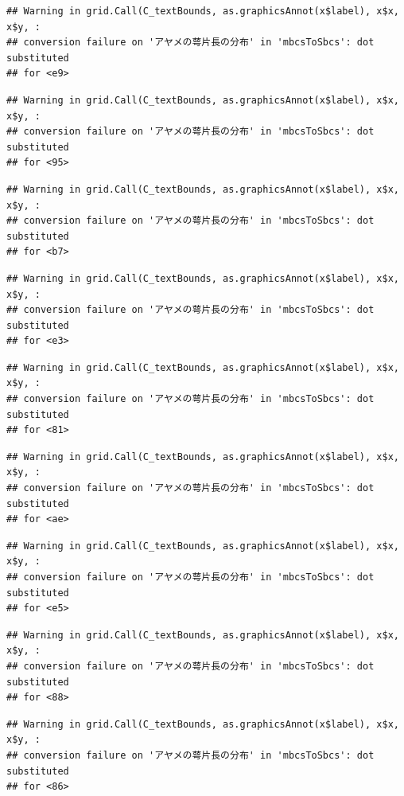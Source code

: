 \documentclass[
]{book}
\begin{document}
\begin{verbatim}
## Warning in grid.Call(C_textBounds, as.graphicsAnnot(x$label), x$x, x$y, :
## conversion failure on 'アヤメの萼片長の分布' in 'mbcsToSbcs': dot substituted
## for <e9>
\end{verbatim}

\begin{verbatim}
## Warning in grid.Call(C_textBounds, as.graphicsAnnot(x$label), x$x, x$y, :
## conversion failure on 'アヤメの萼片長の分布' in 'mbcsToSbcs': dot substituted
## for <95>
\end{verbatim}

\begin{verbatim}
## Warning in grid.Call(C_textBounds, as.graphicsAnnot(x$label), x$x, x$y, :
## conversion failure on 'アヤメの萼片長の分布' in 'mbcsToSbcs': dot substituted
## for <b7>
\end{verbatim}

\begin{verbatim}
## Warning in grid.Call(C_textBounds, as.graphicsAnnot(x$label), x$x, x$y, :
## conversion failure on 'アヤメの萼片長の分布' in 'mbcsToSbcs': dot substituted
## for <e3>
\end{verbatim}

\begin{verbatim}
## Warning in grid.Call(C_textBounds, as.graphicsAnnot(x$label), x$x, x$y, :
## conversion failure on 'アヤメの萼片長の分布' in 'mbcsToSbcs': dot substituted
## for <81>
\end{verbatim}

\begin{verbatim}
## Warning in grid.Call(C_textBounds, as.graphicsAnnot(x$label), x$x, x$y, :
## conversion failure on 'アヤメの萼片長の分布' in 'mbcsToSbcs': dot substituted
## for <ae>
\end{verbatim}

\begin{verbatim}
## Warning in grid.Call(C_textBounds, as.graphicsAnnot(x$label), x$x, x$y, :
## conversion failure on 'アヤメの萼片長の分布' in 'mbcsToSbcs': dot substituted
## for <e5>
\end{verbatim}

\begin{verbatim}
## Warning in grid.Call(C_textBounds, as.graphicsAnnot(x$label), x$x, x$y, :
## conversion failure on 'アヤメの萼片長の分布' in 'mbcsToSbcs': dot substituted
## for <88>
\end{verbatim}

\begin{verbatim}
## Warning in grid.Call(C_textBounds, as.graphicsAnnot(x$label), x$x, x$y, :
## conversion failure on 'アヤメの萼片長の分布' in 'mbcsToSbcs': dot substituted
## for <86>
\end{verbatim}
\end{document}
